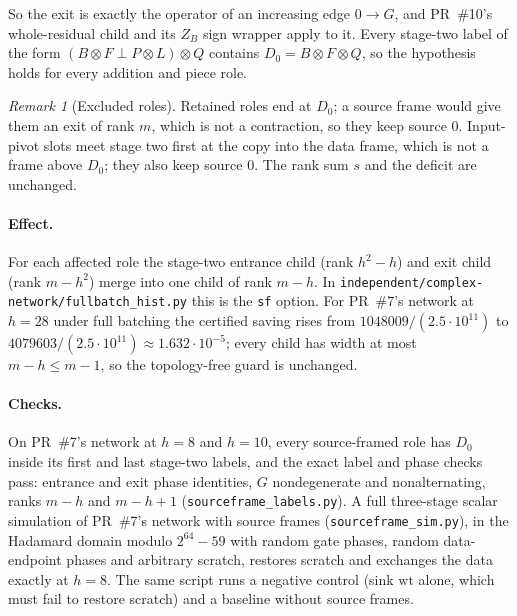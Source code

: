 \documentclass[11pt]{article}
\theoremstyle{remark}\newtheorem*{remark}{Remark}
\begin{document}
So the exit is exactly the operator of an increasing edge $0\to G$, and PR~\#10's whole-residual child and its
$Z_B$ sign wrapper apply to it. Every stage-two label of the form $(B\otimes F\perp P\otimes L)\otimes Q$ contains
$D_0=B\otimes F\otimes Q$, so the hypothesis holds for every addition and piece role.

\begin{remark}[Excluded roles]
Retained roles end at $D_0$; a source frame would give them an exit of rank $m$, which is not a contraction, so
they keep source $0$. Input-pivot slots meet stage two first at the copy into the data frame, which is not a
frame above $D_0$; they also keep source $0$. The rank sum $s$ and the deficit are unchanged.
\end{remark}

\paragraph{Effect.} For each affected role the stage-two entrance child (rank $h^2-h$) and exit child (rank $m-h^2$)
merge into one child of rank $m-h$. In \texttt{independent/complex-network/fullbatch\_hist.py} this is the
\texttt{sf} option. For PR~\#7's network at $h=28$ under full batching the certified saving rises from
$1048009/(2.5\cdot10^{11})$ to $4079603/(2.5\cdot10^{11})\approx1.632\cdot10^{-5}$; every child has width at most
$m-h\le m-1$, so the topology-free guard is unchanged.

\paragraph{Checks.} On PR~\#7's network at $h=8$ and $h=10$, every source-framed role has $D_0$ inside its first
and last stage-two labels, and the exact label and phase checks pass: entrance and exit phase identities, $G$
nondegenerate and nonalternating, ranks $m-h$ and $m-h+1$ (\texttt{sourceframe\_labels.py}). A full three-stage
scalar simulation of PR~\#7's network with source frames (\texttt{sourceframe\_sim.py}), in the Hadamard domain
modulo $2^{64}-59$ with random gate phases, random data-endpoint phases and arbitrary scratch, restores scratch
and exchanges the data exactly at $h=8$. The same script runs a negative control (sink $\mathrm{wt}$ alone, which
must fail to restore scratch) and a baseline without source frames.
\end{document}

